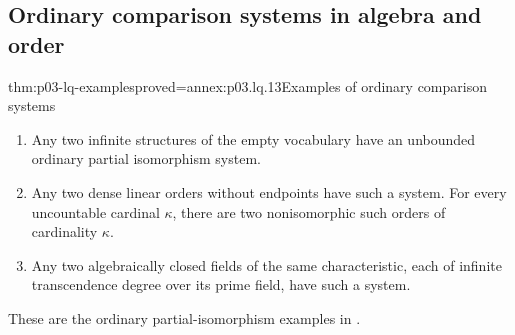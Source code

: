 \subsection{Ordinary comparison systems in algebra and order}

\begin{hbtheorem}{thm:p03-lq-examples}{proved=annex:p03.lq.13}{Examples of ordinary comparison systems}
\begin{enumerate}
 \item Any two infinite structures of the empty vocabulary have an
       unbounded ordinary partial isomorphism system.
 \item Any two dense linear orders without endpoints have such a
       system. For every uncountable cardinal \(\kappa\), there
       are two nonisomorphic such orders of cardinality \(\kappa\).
 \item Any two algebraically closed fields of the same characteristic,
       each of infinite transcendence degree over its prime field,
       have such a system.
\end{enumerate}
These are the ordinary partial-isomorphism examples in
\cite[Ch.~II, \S4.3, pp.~57--58]{Ebbinghaus1985ExtendedLogics}.
\end{hbtheorem}

